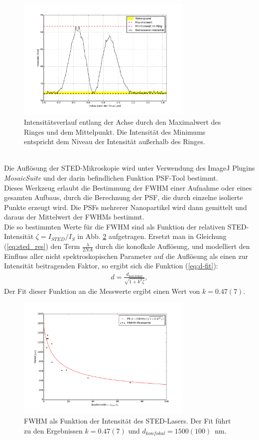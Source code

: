 \begin{figure}
	\centering
	\includegraphics[width=0.75\textwidth]{plots/doughnut.pdf}
	\caption{Intensitätsverlauf entlang der Achse durch den Maximalwert des Ringes und dem Mittelpunkt.
	Die Intensität des Minimums entspricht dem Niveau der Intensität außerhalb des Ringes.}
	\label{fig:doughnut}
\end{figure}
\\ 
Die Auflösung der STED-Mikroskopie wird unter Verwendung des ImageJ Plugins \emph{MosaicSuite} und der darin befindlichen Funktion PSF-Tool bestimmt.\\
Dieses Werkzeug erlaubt die Bestimmung der FWHM einer Aufnahme oder eines gesamten Aufbaus, durch die Berechnung der PSF, die durch einzelne isolierte Punkte erzeugt wird.
Die PSFs mehrerer Nanopartikel wird dann gemittelt und daraus der Mittelwert der FWHMs bestimmt.
\\
Die so bestimmten Werte für die FWHM sind als Funktion der relativen STED-Intensität $\zeta = I_{STED}/I_S$ in Abb. \ref{fig:sted_res} aufgetragen.
Ersetzt man in Gleichung (\ref{eq:sted_res}) den Term $\frac{\lambda}{2NA}$ durch die konofkale Auflösung, und modelliert den Einfluss aller nicht spektroskopischen Parameter auf die Auflösung als einen zur Intensität beitragenden Faktor, so ergibt sich die Funktion (\ref{eq:d-fit}):
\begin{align}
	d = \frac{d_{konfokal}}{\sqrt{1+k^2\zeta}}, \label{eq:d-fit}
\end{align}
Der Fit dieser Funktion an die Messwerte ergibt einen Wert von $k=0.47(7)$.
\begin{figure}
	\centering
	\includegraphics[width=0.75\textwidth]{plots/fwhm_zeta.pdf}
	\caption{FWHM als Funktion der Intensität des STED-Lasers. Der Fit führt zu den Ergebnissen $k = 0.47(7)$ und $d_{konfokal} = 1500(100)$~nm. 
	}\label{fig:sted_res}
\end{figure}

